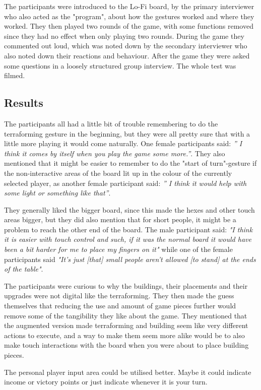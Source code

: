 The participants were introduced to the Lo-Fi board, by the primary interviewer who also acted as the "program", about how the gestures worked and where they worked. They then played two rounds of the game, with some functions removed since they had no effect when only playing two rounds. During the game they commented out loud, which was noted down by the secondary interviewer who also noted down their reactions and behaviour. 
After the game they were asked some questions in a loosely structured group interview. 
The whole test was filmed.

\subsection{Results} 
The participants all had a little bit of trouble remembering to do the terraforming gesture in the beginning, but they were all pretty sure that with a little more playing it would come naturally. One female participants said: \textit{” I think it comes by itself when you play the game some more.”}. They also mentioned that it might be easier to remember to do the "start of turn"-gesture if the non-interactive areas of the board lit up in the colour of the currently selected player, as another female participant said: \textit{” I think it would help with some light or something like that”}.


They generally liked the bigger board, since this made the hexes and other touch areas bigger, but they did also mention that for short people, it might be a problem to reach the other end of the board. The male participant said: \textit{"I think it is easier with touch control and such, if it was the normal board it would have been a bit harder for me to place my fingers on it"} while one of the female participants said \textit{"It’s just [that] small people aren’t allowed [to stand] at the ends of the table"}.

The participants were curious to why the buildings, their placements and their upgrades were not digital like the terraforming. They then made the guess themselves that reducing the use and amount of game pieces further would remove some of the tangibility they like about the game. They mentioned that the augmented version made terraforming and building seem like very different actions to execute, and a way to make them seem more alike would be to also make touch interactions with the board when you were about to place building pieces.

The personal player input area could be utilised better. Maybe it could indicate income or victory points or just indicate whenever it is your turn. 

